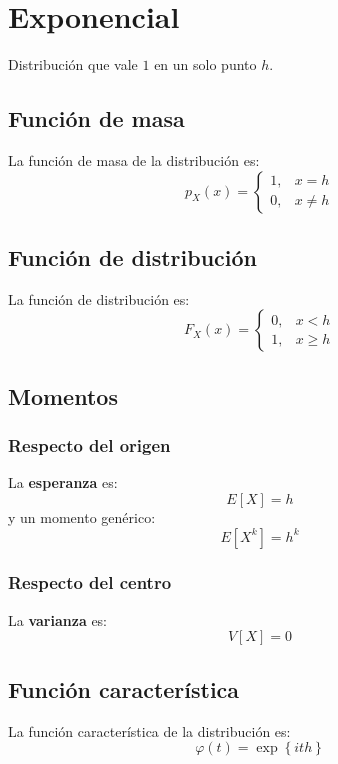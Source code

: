 \section{Exponencial}
\label{sec:exponencial}
Distribución que vale $1$ en un solo punto $h$.

\subsection{Función de masa}
La función de masa de la distribución es:
\[
p_X \left( x \right) = \begin{cases}
    1, &x = h\\
    0, &x \neq h
\end{cases}
\]

\subsection{Función de distribución}
La función de distribución es:
\[
F_X\left( x \right) = \begin{cases}
    0, &x < h\\ 
    1, &x \ge h
\end{cases}
\]

\subsection{Momentos}

\subsubsection*{Respecto del origen}
La \textbf{esperanza} es: 
\[
    E\left[ X \right] = h
\]
y un momento genérico: 
\[
    E\left[ X^k \right] = h^k
\]
\subsubsection*{Respecto del centro}
La \textbf{varianza} es:
\[
    V\left[ X \right] = 0
\]

\subsection{Función característica}
La función característica de la distribución es:
\[
\varphi\left( t \right) = \exp\left\{ ith \right\}
\]

